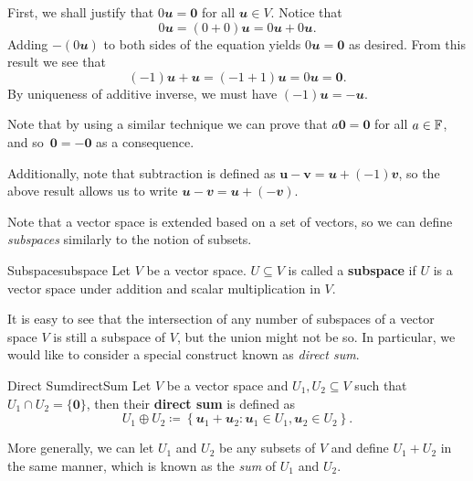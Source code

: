 \documentclass[math, code]{amznotes}
\theoremstyle{remark}
\newcommand{\zero}{\mathbf{0}}
\begin{document}
First, we shall justify that $0\mathbfit{u} = \zero$ for all $\mathbfit{u} \in V$. Notice that
\begin{equation*}
    0\mathbfit{u} = (0 + 0)\mathbfit{u} = 0\mathbfit{u} + 0\mathbfit{u}.
\end{equation*}
Adding $-(0\mathbfit{u})$ to both sides of the equation yields $0\mathbfit{u} = \zero$ as desired. From this result we see that
\begin{equation*}
    (-1)\mathbfit{u} + \mathbfit{u} = (-1 + 1)\mathbfit{u} = 0\mathbfit{u} = \zero.
\end{equation*}
By uniqueness of additive inverse, we must have $(-1)\mathbfit{u} = -\mathbfit{u}$.

Note that by using a similar technique we can prove that $a\zero = \zero$ for all $a \in \mathbb{F}$, and so~$\zero = -\zero$ as a consequence.

Additionally, note that subtraction is defined as $\mathbf{u - v} = \mathbfit{u} + (-1)\mathbfit{v}$, so the above result allows us to write $\mathbfit{u - v} = \mathbfit{u} + (-\mathbfit{v})$.

Note that a vector space is extended based on a set of vectors, so we can define \textit{subspaces} similarly to the notion of subsets.
\begin{dfnbox}{Subspace}{subspace}
    Let $V$ be a vector space. $U \subseteq V$ is called a {\color{red} \textbf{subspace}} if $U$ is a vector space under addition and scalar multiplication in $V$.
\end{dfnbox}
It is easy to see that the intersection of any number of subspaces of a vector space $V$ is still a subspace of $V$, but the union might not be so. In particular, we would like to consider a special construct known as \textit{direct sum}.
\begin{dfnbox}{Direct Sum}{directSum}
    Let $V$ be a vector space and $U_1, U_2 \subseteq V$ such that $U_1 \cap U_2 = \{\zero\}$, then their {\color{red} \textbf{direct sum}} is defined as
    \begin{equation*}
        U_1 \oplus U_2 \coloneqq \left\{\mathbfit{u}_1 + \mathbfit{u}_2 \colon \mathbfit{u}_1 \in U_1, \mathbfit{u}_2 \in U_2\right\}.
    \end{equation*}
\end{dfnbox}
More generally, we can let $U_1$ and $U_2$ be any subsets of $V$ and define $U_1 + U_2$ in the same manner, which is known as the \textit{sum} of $U_1$ and $U_2$.
\end{document}
